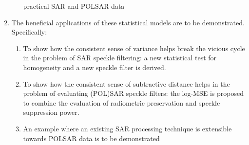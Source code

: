 \begin{enumerate}
\begin{enumerate}
                practical SAR and POLSAR data
                \end{enumerate}
\item The beneficial applications of these
                statistical models are to be demonstrated. Specifically:
                \begin{enumerate}
                \item \label{itm:filter_vicious_circle} To show how the consistent sense of variance
                helps break the vicious cycle in the problem of SAR
                speckle filtering: a new statistical test for
                homogeneity and a new speckle filter is derived.
                \item \label{itm:log_mse} To show how the consistent sense of subtractive
                distance helps in the problem of evaluating (POL)SAR
                speckle filters: the log-MSE is proposed to combine the
                evaluation of radiometric preservation and speckle
                suppression power.
                \item \label{itm:extend_sar_to_polsar} An example where an existing SAR
                processing technique is extensible towards POLSAR data is to be demonstrated
                \end{enumerate}
\end{enumerate}

